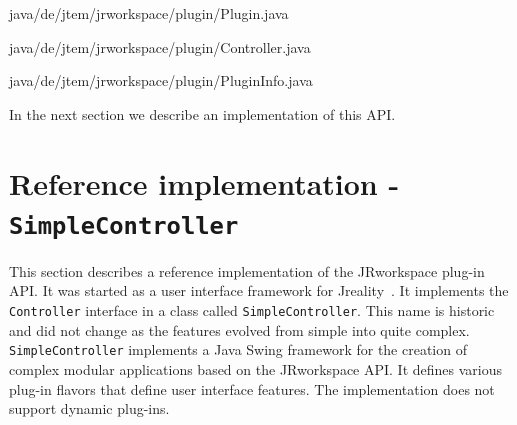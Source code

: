  {java/de/jtem/jrworkspace/plugin/Plugin.java}

 {java/de/jtem/jrworkspace/plugin/Controller.java}

 {java/de/jtem/jrworkspace/plugin/PluginInfo.java}

In the next section we describe an implementation of this API.

\section{Reference implementation - {\tt SimpleController}}
\label{sec:reference_implementation}
This section describes a reference implementation of the {\sc JRworkspace} plug-in API.
It was started as a user interface framework for {\sc Jreality}~\cite{JrealityWebsite}. It implements
the {\tt Controller} interface in a class called {\tt SimpleController}. This name is historic
and did not change as the features evolved from simple into quite complex.
{\tt SimpleController} implements a {\sc Java Swing\TReg} framework for the creation of complex
modular applications based on the {\sc JRworkspace} API. It defines various plug-in flavors
that define user interface features. The implementation does not support dynamic plug-ins.

